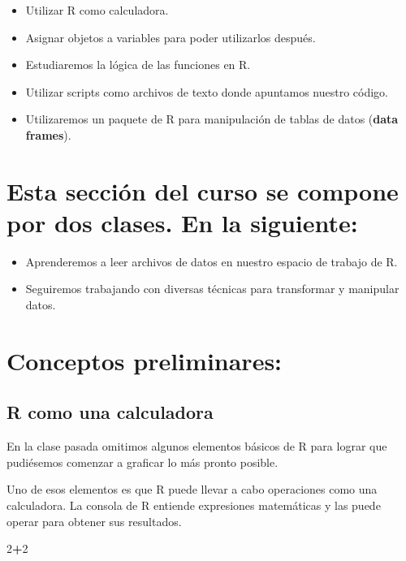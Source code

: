 \documentclass[]{book}
\newenvironment{Shaded}{\begin{snugshade}}{\end{snugshade}}
\newcommand{\DecValTok}[1]{\textcolor[rgb]{0.00,0.00,0.81}{#1}}
\newcommand{\OperatorTok}[1]{\textcolor[rgb]{0.81,0.36,0.00}{\textbf{#1}}}
\providecommand{\tightlist}{%
  \setlength{\itemsep}{0pt}\setlength{\parskip}{0pt}}
\theoremstyle{definition}
\theoremstyle{definition}
\theoremstyle{definition}
\theoremstyle{remark}
\begin{document}
\begin{itemize}
\tightlist
\item
  Utilizar R como calculadora.
\item
  Asignar objetos a variables para poder utilizarlos después.
\item
  Estudiaremos la lógica de las funciones en R.
\item
  Utilizar scripts como archivos de texto donde apuntamos nuestro
  código.
\item
  Utilizaremos un paquete de R para manipulación de tablas de datos
  (\textbf{data frames}).
\end{itemize}

\section{Esta sección del curso se compone por dos clases. En la
siguiente:}\label{esta-seccion-del-curso-se-compone-por-dos-clases.-en-la-siguiente}

\begin{itemize}
\tightlist
\item
  Aprenderemos a leer archivos de datos en nuestro espacio de trabajo de
  R.
\item
  Seguiremos trabajando con diversas técnicas para transformar y
  manipular datos.
\end{itemize}

\section{Conceptos preliminares:}\label{conceptos-preliminares}

\subsection{R como una calculadora}\label{r-como-una-calculadora}

En la clase pasada omitimos algunos elementos básicos de R para lograr
que pudiésemos comenzar a graficar lo más pronto posible.

Uno de esos elementos es que R puede llevar a cabo operaciones como una
calculadora. La consola de R entiende expresiones matemáticas y las
puede operar para obtener sus resultados.

\begin{Shaded}
\begin{Highlighting}[]
\DecValTok{2}\OperatorTok{+}\DecValTok{2}
\end{Highlighting}
\end{Shaded}
\end{document}
